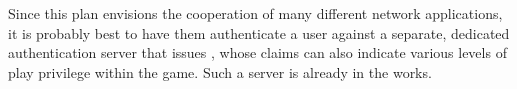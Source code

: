 Since this plan envisions the cooperation of many different network
applications, it is probably best to have them authenticate a user against
a separate, dedicated authentication
server that issues
,
whose claims can also indicate various levels of play privilege
within the game.
Such a server is already in the works.
